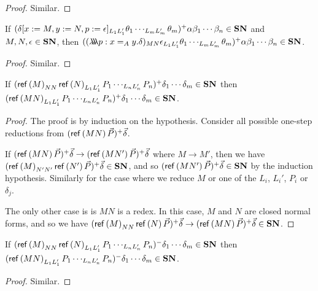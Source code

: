 \begin{proof}
Similar.
\end{proof}

\begin{lemma}
\label{lm:wte_loi3}
If $(\delta[x:=M, y:=N, p:=\epsilon]_{L_1 L_1'} \theta_1 \cdots_{L_m L_m'} \theta_m)^+ \alpha \beta_1 \cdots \beta_n \in \mathbf{SN}$ and $M, N, \epsilon \in \mathbf{SN}$, then
$((\lambda \!\! \lambda \!\! \lambda p:x =_A y.\delta)_{MN} \epsilon_{L_1 L_1'} \theta_1 \cdots_{L_m L_m'} \theta_m)^+ \alpha \beta_1 \cdots \beta_n \in \mathbf{SN}$.
\end{lemma}

\begin{proof}
Similar.
\end{proof}

\begin{lemma}
\label{lm:SNred1}
If $(\mathsf{ref} \left( {M} \right)_{NN} \mathsf{ref} \left( {N} \right)_{L_1 L_1'} P_1 \cdots_{L_n L_n'} P_n)^+ \delta_1 \cdots \delta_m \in \mathbf{SN}$ then \\
$(\mathsf{ref} \left( {MN} \right)_{L_1 L_1'} P_1 \cdots_{L_n L_n'} P_n)^+ \delta_1 \cdots \delta_m \in \mathbf{SN}$.
\end{lemma}

\begin{proof}
The proof is by induction on the hypothesis.  Consider all possible one-step reductions from $(\mathsf{ref} \left( {MN} \right) \vec{P})^+ \vec{\delta}$.

If $(\mathsf{ref} \left( {MN} \right) \vec{P})^+ \vec{\delta} \rightarrow (\mathsf{ref} \left( {MN'} \right) \vec{P})^+ \vec{\delta}$ where $M \rightarrow M'$, then we have $(\mathsf{ref} \left( {M} \right)_{N' N'} \mathsf{ref} \left( {N'} \right) \vec{P})^+ \vec{\delta} \in \mathbf{SN}$, and so
$(\mathsf{ref} \left( {MN'} \right) \vec{P})^+ \vec{\delta} \in \mathbf{SN}$ by the induction hypothesis.  Similarly for the case where we reduce $M$ or one of the $L_i$, $L_i'$, $P_i$ or $\delta_j$.

The only other case is is $MN$ is a redex.  In this case, $M$ and $N$ are closed normal forms, and so we have $(\mathsf{ref} \left( {M} \right)_{NN} \mathsf{ref} \left( {N} \right) \vec{P})^+ \vec{\delta} \rightarrow (\mathsf{ref} \left( {MN} \right) \vec{P})^+ \vec{\delta} \in \mathbf{SN}$.
\end{proof}

\begin{lemma}
If $(\mathsf{ref} \left( {M} \right)_{NN} \mathsf{ref} \left( {N} \right)_{L_1 L_1'} P_1 \cdots_{L_n L_n'} P_n)^- \delta_1 \cdots \delta_m \in \mathbf{SN}$ then \\
$(\mathsf{ref} \left( {MN} \right)_{L_1 L_1'} P_1 \cdots_{L_n L_n'} P_n)^- \delta_1 \cdots \delta_m \in \mathbf{SN}$.
\end{lemma}

\begin{proof}
Similar.
\end{proof}